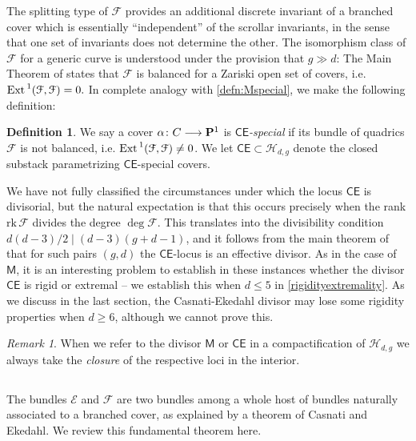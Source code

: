 \documentclass[reqno, 10 pt]{article}
\theoremstyle{definition}
\newtheorem{defn}[thm]{Definition}
\theoremstyle{remark}
\newtheorem{rmk}[thm]{Remark}
\numberwithin{equation}{section}
\numberwithin{thm}{section}
\numberwithin{prop}{section}
\numberwithin{lem}{section}
\numberwithin{cor}{section}
\numberwithin{conj}{section}
\numberwithin{defn}{section}
\renewcommand{\H}{\mathcal H}
\renewcommand{\to}{\longrightarrow}
\newcommand{\sfCE}{{\mathsf {CE}}}
\newcommand{\sfM}{{\mathsf M}}
\newcommand{\cE}{{\mathcal E}}
\newcommand{\cF}{{\mathcal F}}
\renewcommand{\P}{{\bf P}}
\newcommand {\from}{{\colon}}
\renewcommand{\H}{{\mathcal{H}}}
\newcommand{\rk}{{\text{rk}\,}}
\newcommand {\Ext}{{\rm Ext \,}}
\begin{document}
The splitting type of $\cF$ provides an additional discrete invariant of a branched cover which is essentially ``independent'' of the scrollar invariants, in the sense that one set of invariants does not determine the other. The isomorphism class of $\cF$ for a generic curve is understood under the provision that $g \gg d$: The Main Theorem of \cite{bujokas-patel} states that $\cF$ is balanced for a Zariski open set of covers, i.e. $\Ext^{1}(\cF, \cF) = 0.$  In complete analogy with \autoref{defn:Mspecial}, we make the following definition:

\begin{defn}\label{def:CEspecial}
  We say a cover $\alpha \from C \to \P^{1}$ is {\sl $\sfCE$-special} if its bundle of quadrics $\cF$ is not balanced, i.e. $\Ext^{1}(\cF,\cF) \neq 0$. We let $\sfCE \subset \H_{d,g}$ denote the closed substack parametrizing $\sfCE$-special covers.  
\end{defn}

We have not fully classified the circumstances under which the locus $\sfCE$ is divisorial, but the natural expectation is that this occurs precisely when the rank $\rk \cF$ divides the degree $\deg \cF$. This translates into the divisibility condition $d(d-3)/2 \mid (d-3)(g+d-1)$, and it follows from the main theorem of \cite{bujokas-patel} that for such pairs $(g,d)$ the $\sfCE$-locus is an effective divisor. As in the case of $\sfM$, it is an interesting problem to establish in these instances whether the divisor $\sfCE$ is rigid or extremal -- we establish this when $d \leq 5$ in \autoref{rigidityextremality}. As we discuss in the last section, the Casnati-Ekedahl divisor may lose some rigidity properties when $d \geq 6$, although we cannot prove this.


\begin{rmk}
When we refer to the divisor $\sfM$ or $\sfCE$ in a compactification of $\H_{d,g}$ we always take the {\sl closure} of the respective loci in the interior.
\end{rmk}

\subsection{} The bundles $\cE$ and $\cF$ are two bundles among a whole host of bundles naturally associated to a branched cover, as explained by a theorem of Casnati and Ekedahl.  We review this fundamental theorem here. 
\end{document}
